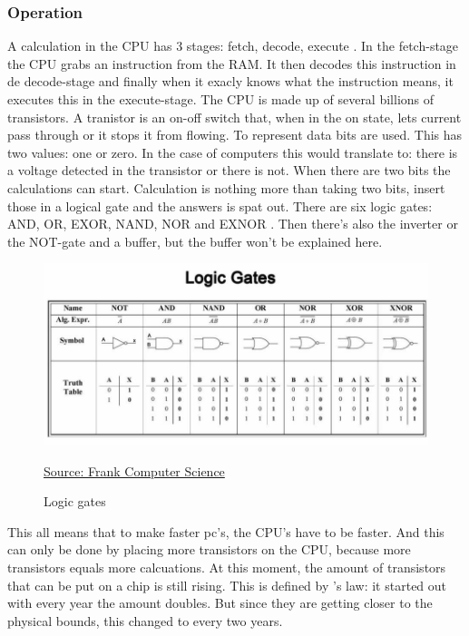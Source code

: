 \subsubsection{Operation} \label{working}
A calculation in the CPU has 3 stages: fetch, decode, execute \autocite{cpu}.
In the fetch-stage the CPU grabs an instruction from the RAM. It then decodes this instruction in de decode-stage and finally when it exacly knows what the instruction means, it executes this in the execute-stage.
The CPU is made up of several billions of transistors. A tranistor is an on-off switch that, when in the on state, lets current pass through or it stops it from flowing.
To represent data bits are used. This has two values: one or zero\autocite{bit}. In the case of computers this would translate to: there is a voltage detected in the transistor or there is not.
When there are two bits the calculations can start. Calculation is nothing more than taking two bits, insert those in a logical gate and the answers is spat out.
There are six logic gates: AND, OR, EXOR, NAND, NOR and EXNOR \autocite{gates}. Then there's also the inverter or the NOT-gate and a buffer, but the buffer won't be explained here.

\begin{figure} [h]
    \centering
    \includegraphics[width=\textwidth]{img/gates.jpg}
        \caption{Logic gates}
        \label{fig:logicGates}
        \href{https://frankcomputerscience.wordpress.com/chapter-3/}{Source: Frank Computer Science}
\end{figure}

This all means that to make faster pc's, the CPU's have to be faster. And this can only be done by placing more transistors on the CPU, because more transistors equals more calcuations.
At this moment, the amount of transistors that can be put on a chip is still rising. This is defined by \textcite{Moore1965}'s law: it started out with every year the amount doubles. But since they are getting closer to the physical bounds, this changed to every two years.


